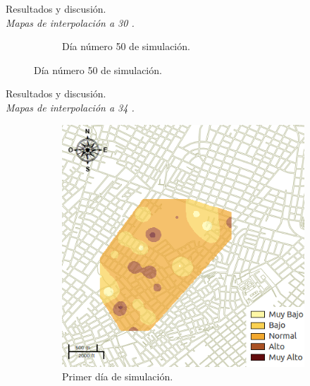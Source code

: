 \begin{frame}[t]{Resultados y discusión.\\\textit{Mapas de interpolación a 30 \textcelsius.}}
\begin{figure}
\begin{subfigure}[b]{0.45\textwidth}
        \caption{Día número 50 de simulación.}
    \end{subfigure}
    \end{figure}
\end{frame}


\begin{frame}[t]{Resultados y discusión.\\\textit{Mapas de interpolación a 34 \textcelsius.}}
    \begin{figure}
    \begin{subfigure}[b]{0.45\textwidth}
        \includegraphics[width=\textwidth]{./graphics/temp-34-0.png}
        \caption{ Primer día de simulación.}
    \end{subfigure}
    ~~~~
    \begin{subfigure}[b]{0.45\textwidth}

\end{subfigure}
\end{figure}
\end{frame}
